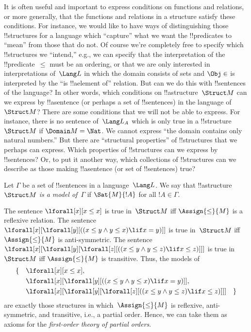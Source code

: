 \documentclass[../../../include/open-logic-section]{subfiles}
\begin{document}


\begin{explain}
It is often useful and important to express conditions on
functions and relations, or more generally, that the functions and
relations in a structure satisfy these conditions.  For instance, we
would like to have ways of distinguishing those !!{structure}s for a
language which ``capture'' what we want the !!{predicate}s to ``mean''
from those that do not.  Of course we're completely free to specify
which !!{structure}s we ``intend,'' e.g., we can specify that the
interpretation of the !!{predicate}~$\le$ must be an ordering, or that
we are only interested in interpretations of~$\Lang L$ in which the
domain consists of sets and $\Obj \in$ is interpreted by the ``is
!!a{element} of'' relation.  But can we do this with !!{sentence}s of
the language?  In other words, which conditions on
!!a{structure}~$\Struct M$ can we express by !!a{sentence} (or perhaps
a set of !!{sentence}s) in the language of~$\Struct M$?  There are
some conditions that we will not be able to express.  For instance,
there is no sentence of~$\Lang L_A$ which is only true in a
!!{structure}~$\Struct M$ if $\Domain M = \Nat$.  We cannot express
``the domain contains only natural numbers.''  But there are
``structural properties'' of !!{structure}s that we perhaps can
express.  Which properties of !!{structure}s can we express by
!!{sentence}s?  Or, to put it another way, which collections of
!!{structure}s can we describe as those making !!a{sentence} (or set
of !!{sentence}s) true?
\end{explain}

\begin{defn}
Let $\Gamma$ be a set of !!{sentence}s in a language~$\Lang L$.  We
say that !!a{structure}~$\Struct M$ \emph{is a model of}~$\Gamma$ if
$\Sat{M}{!A}$ for all $!A \in \Gamma$.
\end{defn}

\begin{ex}
The sentence $\lforall[x][x \le x]$ is true in~$\Struct M$ iff
$\Assign{\le}{M}$ is a reflexive relation.  The sentence
$\lforall[x][\lforall[y][((x \le y \land y \le x) \lif x = y)]]$ is
true in~$\Struct M$ iff $\Assign{\le}{M}$ is anti-symmetric.  The
sentence $\lforall[x][\lforall[y][\lforall[z][((x \le y \land y \le z)
      \lif x \le z)]]]$ is true in~$\Struct M$ iff $\Assign{\le}{M}$
is transitive.  Thus, the models of
\begin{align*}
\{\quad &\lforall[x][x \le x], \\
   & \lforall[x][\lforall[y][((x \le y \land y \le
    x) \lif x = y)]], \\
   &\lforall[x][\lforall[y][\lforall[z][((x \le y
      \land y \le z) \lif x \le z)]]] \quad \}
\end{align*}
are exactly those structures in which~$\Assign{\le}{M}$ is reflexive,
anti-symmetric, and transitive, i.e., a partial order.  Hence, we can take
them as axioms for the \emph{first-order theory of partial orders}.
\end{ex}
\end{document}
